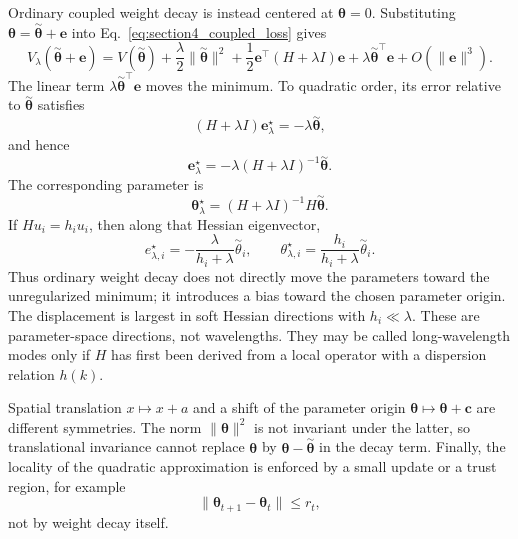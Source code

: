 \documentclass[11pt,letterpaper]{article}
\newcommand{\thet}{\bm{\theta}}
\begin{document}
Ordinary coupled weight decay is instead centered at \(\thet=0\). Substituting
\(\thet=\overset{\sim}{\thet}+\bm e\) into Eq.~\eqref{eq:section4_coupled_loss} gives
\begin{equation}\label{eq:origin_decay_in_error_coordinates}
  V_\lambda(\overset{\sim}{\thet}+\bm e)
  =V(\overset{\sim}{\thet})
   +\frac{\lambda}{2}\lVert\overset{\sim}{\thet}\rVert^2
   +\frac12\bm e^\top(H+\lambda I)\bm e
   +\lambda\overset{\sim}{\thet}^{\top}\bm e
   +O(\lVert\bm e\rVert^3).
\end{equation}
The linear term \(\lambda\overset{\sim}{\thet}^{\top}\bm e\) moves the minimum. To
quadratic order, its error relative to \(\overset{\sim}{\thet}\) satisfies
\begin{equation}
  (H+\lambda I)\bm e_\lambda^\star
  =-\lambda\overset{\sim}{\thet},
\end{equation}
and hence
\begin{equation}\label{eq:regularized_error}
  \bm e_\lambda^\star
  =-\lambda(H+\lambda I)^{-1}\overset{\sim}{\thet}.
\end{equation}
The corresponding parameter is
\begin{equation}\label{eq:regularized_parameter}
  \thet_\lambda^\star
  =(H+\lambda I)^{-1}H\overset{\sim}{\thet}.
\end{equation}
If \(Hu_i=h_i u_i\), then along that Hessian eigenvector,
\begin{equation}
  e_{\lambda,i}^\star
  =-\frac{\lambda}{h_i+\lambda}\overset{\sim}{\theta}_i,
  \qquad
  \theta_{\lambda,i}^\star
  =\frac{h_i}{h_i+\lambda}\overset{\sim}{\theta}_i.
\end{equation}
Thus ordinary weight decay does not directly move the parameters toward the
unregularized minimum; it introduces a bias toward the chosen parameter
origin. The displacement is largest in soft Hessian directions with
\(h_i\ll\lambda\). These are parameter-space directions, not wavelengths.
They may be called long-wavelength modes only if \(H\) has first been derived
from a local operator with a dispersion relation \(h(k)\).

Spatial translation \(x\mapsto x+a\) and a shift of the parameter origin
\(\thet\mapsto\thet+\bm c\) are different symmetries. The norm
\(\lVert\thet\rVert^2\) is not invariant under the latter, so translational
invariance cannot replace \(\thet\) by \(\thet-\overset{\sim}{\thet}\) in the decay
term. Finally, the locality of the quadratic approximation is enforced by a
small update or a trust region, for example
\begin{equation}
  \lVert\thet_{t+1}-\thet_t\rVert\leq r_t,
\end{equation}
not by weight decay itself.
\end{document}
